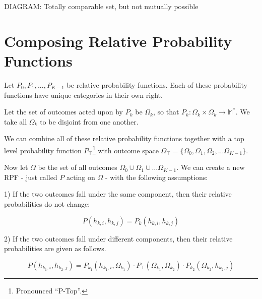 \documentclass[twoside]{article}
\newcommand{\quotes}[1]{``#1''}
\theoremstyle{plain}%
\theoremstyle{definition}
\theoremstyle{remark}
\begin{document}
DIAGRAM: Totally comparable set, but not mutually possible

\section{Composing Relative Probability Functions}

Let \(P_0, P_1, ..., P_{K-1}\) be relative probability functions. Each of these probability functions have unique categories in their own right.

Let the set of outcomes acted upon by \(P_k\) be \(\Omega_k\), so that \(P_k: \Omega_k \times \Omega_k \rightarrow \mathbb{M}^{\ast}\). We take all \(\Omega_k\) to be disjoint from one another.

We can combine all of these relative probability functions together with a top level probability function \(P_\top\)\footnote{Pronounced \quotes{P-Top}.} with outcome space \(\Omega_\top = \{\Omega_0, \Omega_1, \Omega_2, ... \Omega_{K- 1}\}\).


Now let \(\Omega\) be the set of all outcomes \(\Omega_0 \cup \Omega_1 \cup \dots \Omega_{K-1}\). We can create a new RPF - just called \(P\) acting on \(\Omega\) - with the following assumptions:

1) If the two outcomes fall under the same component, then their relative probabilities do not change:

\begin{equation}
\label{rpf_composition_same_branch}
P(h_{k, i}, h_{k, j}) = P_k(h_{k, i}, h_{k, j})
\end{equation}

2) If the two outcomes fall under different components, then their relative probabilities are given as follows.

\begin{equation}
\label{rpf_composition_different_branch}
P(h_{k_1, i}, h_{k_2, j}) = P_{k_1}(h_{k_1, i}, \Omega_{k_1}) \cdot  P_{\top}(\Omega_{k_1}, \Omega_{k_2}) \cdot P_{k_2}(\Omega_{k_2}, h_{k_2, j})
\end{equation}
\end{document}
